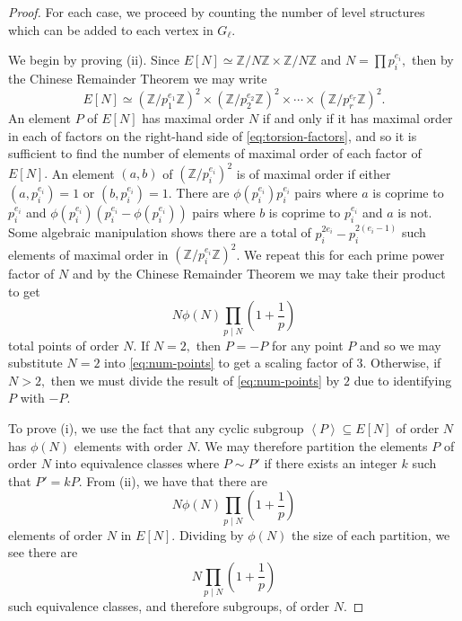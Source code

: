 \documentclass[10pt,a4paper]{amsart}
\begin{document}
\begin{proof}
  For each case, we proceed by counting the number of level structures which can be added to each vertex in $G_{\ell}.$

  We begin by proving (ii). Since $E[N] \simeq \mathbb{Z}/N\mathbb{Z} \times \mathbb{Z}/N \mathbb{Z}$ and $N = \prod p_i^{e_i},$ then by the Chinese Remainder Theorem we may write
  \begin{equation}\label{eq:torsion-factors}
    E[N] \simeq \left( \mathbb{Z}/p_1^{e_1}\mathbb{Z} \right)^2 \times \left( \mathbb{Z}/p_2^{e_2}\mathbb{Z} \right)^2 \times \cdots \times \left( \mathbb{Z}/p_r^{e_r}\mathbb{Z} \right)^2.
  \end{equation}
   An element $P$ of $E[N]$ has maximal order $N$ if and only if it has maximal order in each of factors on the right-hand side of \eqref{eq:torsion-factors}, and so it is sufficient to find the number of elements of maximal order of each factor of $E[N].$ An element $(a,b)$ of $(\mathbb{Z}/p_i^{e_i})^2$ is of maximal order if either $(a,p_i^{e_i}) = 1$ or $(b, p_i^{e_i}) = 1.$ There are $\phi(p_i^{e_i})p_i^{e_i}$ pairs where $a$ is coprime to $p_i^{e_i}$ and $\phi(p_i^{e_i})(p_i^{e_i} - \phi(p_i^{e_i}))$ pairs where $b$ is coprime to $p_i^{e_i}$ and $a$ is not. Some algebraic manipulation shows there are a total of $p_i^{2e_i} - p_i^{2(e_i-1)}$ such elements of maximal order in $(\mathbb{Z}/p_i^{e_i}\mathbb{Z})^2$. We repeat this for each prime power factor of $N$ and by the Chinese Remainder Theorem we may take their product to get
  \begin{equation}\label{eq:num-points}
    N \phi(N) \prod_{p \mid N}\left(1 + \frac{1}{p}\right)
  \end{equation}
  total points of order $N.$ If $N = 2,$ then $P = -P$ for any point $P$ and so we may substitute $N = 2$ into \eqref{eq:num-points} to get a scaling factor of $3.$ Otherwise, if $N > 2,$ then we must divide the result of \eqref{eq:num-points} by $2$ due to identifying $P$ with $-P.$

  To prove (i), we use the fact that any cyclic subgroup $\left\langle P \right\rangle \subseteq E[N]$ of order $N$ has $\phi(N)$ elements with order $N.$ We may therefore partition the elements $P$ of order $N$ into equivalence classes where $P \sim P'$ if there exists an integer $k$ such that $P' = kP.$ From (ii), we have that there are
  \[
    N\phi(N)\prod_{p \mid N}\left( 1 + \frac{1}{p} \right)
  \]
  elements of order $N$ in $E[N].$ Dividing by $\phi(N)$ the size of each partition, we see there are
  \[
     N \prod_{p \mid N}\left( 1 + \frac{1}{p} \right)
  \]
  such equivalence classes, and therefore subgroups, of order $N.$


\end{proof}
\end{document}
